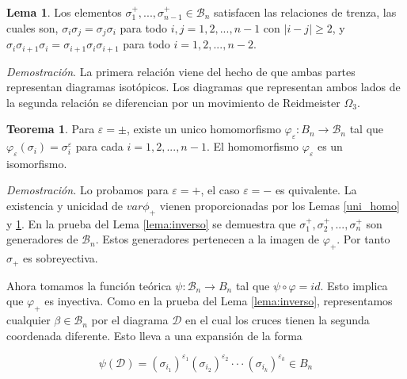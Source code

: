 \documentclass[12pt]{article}
\theoremstyle{definition}
\newtheorem{teor}{Teorema}[section]
\newtheorem{lema}{Lema}[section]
\begin{document}
\begin{lema}
Los elementos $\sigma_1^+,...,\sigma_{n-1}^+\in\mathcal{B}_n$ satisfacen las relaciones de trenza, las cuales son, $\sigma_i\sigma_j = \sigma_j\sigma_i$ para todo $i,j=1,2,...,n-1$ con $|i-j|\geq 2$, y $\sigma_i\sigma_{i+1}\sigma_i =\sigma_{i+1}\sigma_i\sigma_{i+1}$ para todo $i=1,2,...,n-2$.
\label{lema:rel_geom}
\end{lema}

\textit{Demostración}. La primera relación viene del hecho de que ambas partes representan diagramas isotópicos. Los diagramas que representan ambos lados de la segunda relación se diferencian por un movimiento de Reidmeister $\Omega_3$.

\begin{teor}
Para $\varepsilon = \pm$, existe un unico homomorfismo $\varphi_\varepsilon : B_n\rightarrow\mathcal{B}_n$ tal que $\varphi_\varepsilon(\sigma_i) = \sigma_i^\varepsilon$ para cada $i=1,2,...,n-1$. El homomorfismo $\varphi_\varepsilon$ es un isomorfismo.
\end{teor}

\textit{Demostración.} Lo probamos para $\varepsilon = +$, el caso $\varepsilon = -$ es quivalente. La existencia y unicidad de $var\phi_+$ vienen proporcionadas por los Lemas \ref{uni_homo} y \ref{lema:rel_geom}. En la prueba del Lema \ref{lema:inverso} se demuestra que $\sigma_1^+,\sigma_2^+,...,\sigma_n^+$ son generadores de $\mathcal{B}_n$. Estos generadores pertenecen a la imagen de $\varphi_+$. Por tanto $\sigma_+$ es sobreyectiva.

Ahora tomamos la función teórica $\psi :\mathcal{B}_n\rightarrow B_n$ tal que $\psi \circ \varphi = id$. Esto implica que $\varphi_+$ es inyectiva. Como en la prueba del Lema \ref{lema:inverso}, representamos cualquier $\beta\in\mathcal{B}_n$ por el diagrama $\mathcal{D}$ en el cual los cruces tienen la segunda coordenada diferente. Esto lleva a una expansión de la forma \label{hola}

\begin{equation}\label{form:expansion}
\psi(\mathcal{D})=(\sigma_{i_1})^{\varepsilon_1}(\sigma_{i_2})^{\varepsilon_2}\cdot\cdot\cdot(\sigma_{i_k})^{\varepsilon_k}\in B_n
\end{equation}
\end{document}
